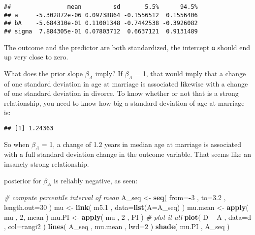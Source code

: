 \documentclass[
]{article}
\newenvironment{Shaded}{\begin{snugshade}}{\end{snugshade}}
\newcommand{\CommentTok}[1]{\textcolor[rgb]{0.56,0.35,0.01}{\textit{#1}}}
\newcommand{\DataTypeTok}[1]{\textcolor[rgb]{0.13,0.29,0.53}{#1}}
\newcommand{\DecValTok}[1]{\textcolor[rgb]{0.00,0.00,0.81}{#1}}
\newcommand{\FloatTok}[1]{\textcolor[rgb]{0.00,0.00,0.81}{#1}}
\newcommand{\KeywordTok}[1]{\textcolor[rgb]{0.13,0.29,0.53}{\textbf{#1}}}
\newcommand{\NormalTok}[1]{#1}
\newcommand{\OperatorTok}[1]{\textcolor[rgb]{0.81,0.36,0.00}{\textbf{#1}}}
\newcommand{\StringTok}[1]{\textcolor[rgb]{0.31,0.60,0.02}{#1}}
\begin{document}
\begin{verbatim}
##                mean         sd       5.5%      94.5%
## a     -5.302872e-06 0.09738864 -0.1556512  0.1556406
## bA    -5.684310e-01 0.11001348 -0.7442538 -0.3926082
## sigma  7.884305e-01 0.07803712  0.6637121  0.9131489
\end{verbatim}

The outcome and the predictor are both standardized, the intercept α
should end up very close to zero.

What does the prior slope \(\beta_{A}\) imply? If \(\beta_{A}\) = 1,
that would imply that a change of one standard deviation in age at
marriage is associated likewise with a change of one standard deviation
in divorce. To know whether or not that is a strong relationship, you
need to know how big a standard deviation of age at marriage is:

\begin{Shaded}
\end{Shaded}

\begin{verbatim}
## [1] 1.24363
\end{verbatim}

So when \(\beta_{A}\) = 1, a change of 1.2 years in median age at
marriage is associated with a full standard deviation change in the
outcome variable. That seems like an insanely strong relationship.

posterior for \(\beta_{A}\) is reliably negative, as seen:

\begin{Shaded}
\begin{Highlighting}[]
\CommentTok{# compute percentile interval of mean}
\NormalTok{A_seq <-}\StringTok{ }\KeywordTok{seq}\NormalTok{( }\DataTypeTok{from=}\OperatorTok{-}\DecValTok{3}\NormalTok{ , }\DataTypeTok{to=}\FloatTok{3.2}\NormalTok{ , }\DataTypeTok{length.out=}\DecValTok{30}\NormalTok{ )}
\NormalTok{mu <-}\StringTok{ }\KeywordTok{link}\NormalTok{( m5}\FloatTok{.1}\NormalTok{ , }\DataTypeTok{data=}\KeywordTok{list}\NormalTok{(}\DataTypeTok{A=}\NormalTok{A_seq) )}
\NormalTok{mu.mean <-}\StringTok{ }\KeywordTok{apply}\NormalTok{( mu , }\DecValTok{2}\NormalTok{, mean )}
\NormalTok{mu.PI <-}\StringTok{ }\KeywordTok{apply}\NormalTok{( mu , }\DecValTok{2}\NormalTok{ , PI )}
\CommentTok{# plot it all}
\KeywordTok{plot}\NormalTok{( D }\OperatorTok{~}\StringTok{ }\NormalTok{A , }\DataTypeTok{data=}\NormalTok{d , }\DataTypeTok{col=}\NormalTok{rangi2 )}
\KeywordTok{lines}\NormalTok{( A_seq , mu.mean , }\DataTypeTok{lwd=}\DecValTok{2}\NormalTok{ )}
\KeywordTok{shade}\NormalTok{( mu.PI , A_seq )}
\end{Highlighting}
\end{Shaded}
\end{document}
